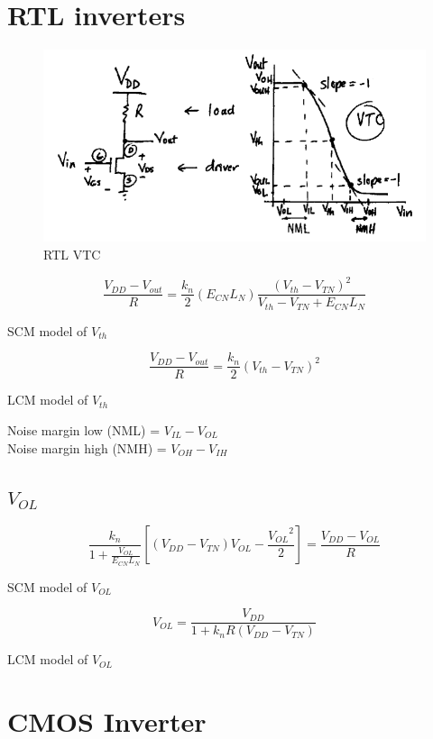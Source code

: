 \documentclass[12pt,letterpaper]{article}
\newcommand\ddfrac[2]{\frac{\displaystyle #1}{\displaystyle #2}}
\newcommand{\capequation}[1]{\begin{center} #1 \end{center}}
\begin{document}
\section*{RTL inverters}

\begin{figure}[h!]
  \centering
  \includegraphics[width=5.5in]{rtl_vtc.png}
  \caption{RTL VTC}
  \label{fig:pa}
\end{figure}

\begin{equation}
\frac{V_{DD} - V_{out}}{R} = \frac{k_n}{2}(E_{CN}L_N)\frac{(V_{th} - V_{TN})^2}{V_{th} - V_{TN} + E_{CN}L_N}
\end{equation}
\capequation{SCM model of $V_{th}$}

\begin{equation}
\frac{V_{DD} - V_{out}}{R} = \frac{k_n}{2}(V_{th} - V_{TN})^2
\end{equation}
\capequation{LCM model of $V_{th}$}

Noise margin low (NML) = $V_{IL} - V_{OL}$ \\
Noise margin high (NMH) = $V_{OH} - V_{IH}$

\subsection*{$V_{OL}$}
\begin{equation}
\ddfrac{k_n}{1+\frac{V_{OL}}{E_{CN}L_N}}\left[(V_{DD}-V_{TN})V_{OL} - \frac{{V_{OL}}^2}{2}\right] = \ddfrac{V_{DD} - V_{OL}}{R}
\end{equation}
\capequation{SCM model of $V_{OL}$}

\begin{equation}
V_{OL} = \frac{V_{DD}}{1 + k_nR(V_{DD} - V_{TN})}
\end{equation}
\capequation{LCM model of $V_{OL}$}

\section*{CMOS Inverter}
\end{document}
